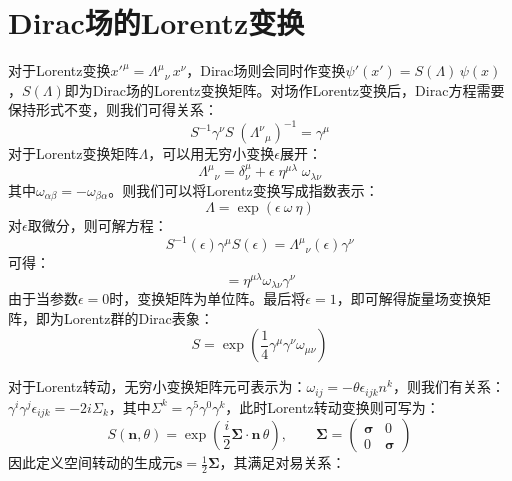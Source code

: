 \section{Dirac场的Lorentz变换}
对于Lorentz变换$x'^{\mu}={\Lambda^{\mu}}_{\nu}\,x^{\nu}$，Dirac场则会同时作变换$\psi'(x')=S(\Lambda)\,\psi(x)$，$S(\Lambda)$即为Dirac场的Lorentz变换矩阵。对场作Lorentz变换后，Dirac方程需要保持形式不变，则我们可得关系：
\begin{equation}
S^{-1}\gamma^{\nu}S\;({\Lambda^{\nu}}_{\mu})^{-1}=\gamma^{\mu}
\end{equation}
对于Lorentz变换矩阵$\Lambda$，可以用无穷小变换$\epsilon$展开：
\begin{equation}
{\Lambda^{\mu}}_{\nu}=\delta^{\mu}_{\nu}+\epsilon\;\eta^{\mu\lambda}\;\omega_{\lambda\nu}
\end{equation}
其中$\omega_{\alpha\beta}=-\omega_{\beta\alpha}$。则我们可以将Lorentz变换写成指数表示：
\begin{equation}
\Lambda=\exp(\epsilon\:\omega\:\eta)
\end{equation}
对$\epsilon$取微分，则可解方程：
\begin{equation}
S^{-1}(\epsilon)\gamma^{\mu}S(\epsilon)={\Lambda^\mu}_\nu(\epsilon)\gamma^\nu
\end{equation}
可得：
\begin{equation}
[\gamma^\mu,\frac{\mathrm{d}S}{\mathrm{d}\epsilon}S^{-1}]=\eta^{\mu\lambda}\omega_{\lambda\nu}\gamma^\nu
\end{equation}
由于当参数$\epsilon=0$时，变换矩阵为单位阵。最后将$\epsilon=1$，即可解得旋量场变换矩阵，即为Lorentz群的Dirac表象：
\begin{equation}
S=\exp\left(\frac{1}{4}\gamma^\mu \gamma^\nu\omega_{\mu\nu}\right)
\end{equation}
\par 对于Lorentz转动，无穷小变换矩阵元可表示为：$\omega_{ij}=-\theta\epsilon_{ijk}n^k$，则我们有关系：$\gamma^i\gamma^j\epsilon_{ijk}=-2i\Sigma_k$，其中$\Sigma^k=\gamma^5\gamma^0\gamma^k$，此时Lorentz转动变换则可写为：
\begin{equation}
S(\boldsymbol{n},\theta)=\exp\left(\frac{i}{2}\boldsymbol{\Sigma}\cdot\boldsymbol{n} \,\theta\right),\qquad\boldsymbol{\Sigma}=\begin{pmatrix}
\boldsymbol{\sigma}&	0\\
0&		\boldsymbol{\sigma}
\end{pmatrix}
\end{equation}
因此定义空间转动的生成元$\boldsymbol{s}=\frac{1}{2}\boldsymbol{\Sigma}$，其满足对易关系：
